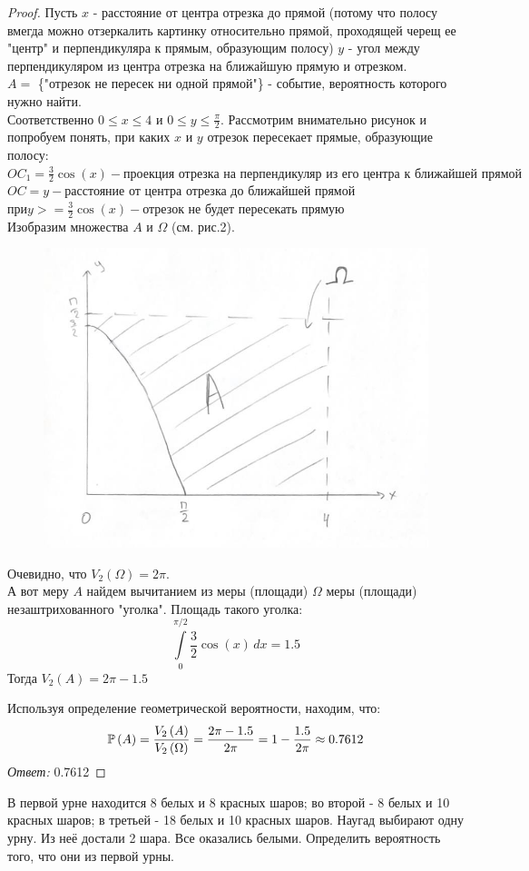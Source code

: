 \begin{proof}
Пусть $ x $ - расстояние от центра отрезка до {} прямой (потому что полосу вмегда можно отзеркалить картинку относительно прямой, проходящей черещ ее "центр" и перпендикуляра к прямым, образующим полосу) $ y $ - угол между перпендикуляром из центра отрезка на ближайшую прямую и отрезком.\\
$ A =$ \{"отрезок не пересек ни одной прямой"\} - событие, вероятность которого нужно найти.\\
Соответственно $ 0\le x\le4 $ и $ 0\le y\le\frac{\pi}{2}$.
Рассмотрим внимательно рисунок и попробуем понять, при каких $ x $ и $ y $ отрезок пересекает прямые, образующие полосу:\\
$ OC_1 = \frac{3}{2}\cos(x) - \text{проекция отрезка на перпендикуляр из его центра к ближайшей прямой} $\\
$ OC = y - \text{расстояние от центра отрезка до ближайшей прямой} $\\
$ при y >= \frac{3}{2}\cos(x) - \text{отрезок не будет пересекать прямую} $\\

Изобразим множества $ A $ и $ \Omega $ (см. рис.2).
\begin{figure}[h!]
    \centering
    \includegraphics[width=0.5\linewidth]{2.jpg}
    \caption{}
    \label{fig:enter-label}
\end{figure}
Очевидно, что $ V_2\left(\Omega\right) = 2\pi$.\\
А вот меру $ A $ найдем вычитанием из меры (площади) $ \Omega $ меры (площади) незаштрихованного "уголка". Площадь такого уголка:
\[
\int\limits_0^{\pi/2} \frac{3}{2}\cos(x) \, dx = 1.5
\]
Тогда $ V_2\left(A\right) = 2\pi - 1.5 $

Используя определение геометрической вероятности, находим, что:
\[
\mathbb P\left(A\right) = \frac{V_2\left(A\right)}{V_2\left(\Omega\right)} = \frac{2\pi - 1.5}{2\pi} = 1 - \frac{1.5}{2\pi}\approx 0.7612
\]
{\it Ответ:} 0.7612
\end{proof}

\begin{problem}
В первой урне находится 8 белых и 8 красных шаров; во второй - 8 белых и 10 красных шаров; в третьей - 18 белых и 10 красных шаров. Наугад выбирают одну урну. Из неё достали 2 шара. Все оказались белыми. Определить вероятность того, что они из первой урны.\\
\end{problem}


